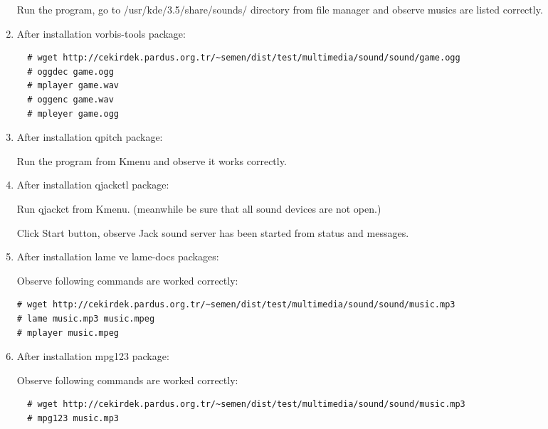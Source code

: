 \documentclass[a4paper,10pt]{article}
\begin{document}
\begin{enumerate}
Run the program, go to /usr/kde/3.5/share/sounds/ directory from file manager and observe musics are listed correctly.

\item After installation vorbis-tools package: 
 \begin{verbatim}
  # wget http://cekirdek.pardus.org.tr/~semen/dist/test/multimedia/sound/sound/game.ogg
  # oggdec game.ogg
  # mplayer game.wav
  # oggenc game.wav
  # mpleyer game.ogg
 \end{verbatim}

\item After installation qpitch package:

Run the program from Kmenu and observe it works correctly.

\item After installation qjackctl package: 

Run qjackct from Kmenu. (meanwhile be sure that all sound devices are not open.)

Click Start button, observe Jack sound server has been started from status and messages.

\item After installation lame ve lame-docs packages: 

Observe following commands are worked correctly:
\begin{verbatim}
# wget http://cekirdek.pardus.org.tr/~semen/dist/test/multimedia/sound/sound/music.mp3
# lame music.mp3 music.mpeg
# mplayer music.mpeg
\end{verbatim}

\item After installation mpg123 package:

Observe following commands are worked correctly:
 \begin{verbatim}
  # wget http://cekirdek.pardus.org.tr/~semen/dist/test/multimedia/sound/sound/music.mp3
  # mpg123 music.mp3
 \end{verbatim}


\end{enumerate}
\end{document}
